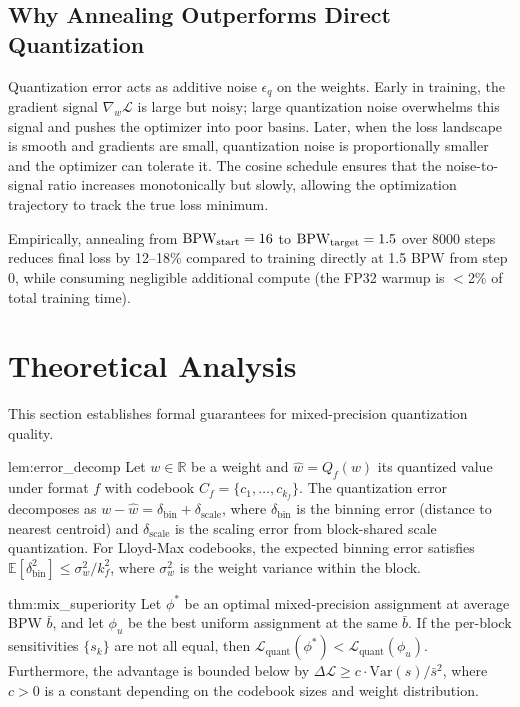 \subsection{Why Annealing Outperforms Direct Quantization}

Quantization error acts as additive noise $\epsilon_q$ on the weights.
Early in training, the gradient signal $\nabla_w \mathcal{L}$ is large
but noisy; large quantization noise overwhelms this signal and pushes
the optimizer into poor basins.  Later, when the loss landscape is
smooth and gradients are small, quantization noise is proportionally
smaller and the optimizer can tolerate it.  The cosine schedule ensures
that the noise-to-signal ratio increases monotonically but slowly,
allowing the optimization trajectory to track the true loss minimum.

Empirically, annealing from $\textnormal{BPW}_{\text{start}} = 16$ to
$\textnormal{BPW}_{\text{target}} = 1.5$ over 8000 steps reduces final loss by
12--18\% compared to training directly at 1.5 BPW from step 0, while
consuming negligible additional compute (the FP32 warmup is $<$2\% of
total training time).

\section{Theoretical Analysis}
\label{sec:mix_theory}

This section establishes formal guarantees for mixed-precision
quantization quality.

\begin{mylemma}{lem:error_decomp}
Let $w \in \mathbb{R}$ be a weight and $\hat{w} = Q_f(w)$ its
quantized value under format $f$ with codebook
$C_f = \{c_1, \ldots, c_{k_f}\}$.  The quantization error decomposes
as $w - \hat{w} = \delta_{\text{bin}} + \delta_{\text{scale}}$, where
$\delta_{\text{bin}}$ is the binning error (distance to nearest
centroid) and $\delta_{\text{scale}}$ is the scaling error from
block-shared scale quantization.  For Lloyd-Max codebooks, the expected
binning error satisfies
$\mathbb{E}[\delta_{\text{bin}}^2] \leq \sigma_w^2 / k_f^2$, where
$\sigma_w^2$ is the weight variance within the block.
\end{mylemma}

\begin{mythm}{thm:mix_superiority}
Let $\phi^*$ be an optimal mixed-precision assignment at average BPW
$\bar{b}$, and let $\phi_u$ be the best uniform assignment at the same
$\bar{b}$.  If the per-block sensitivities $\{s_k\}$ are not all
equal, then
$\mathcal{L}_{\text{quant}}(\phi^*) < \mathcal{L}_{\text{quant}}(\phi_u)$.
Furthermore, the advantage is bounded below by
$\Delta \mathcal{L} \geq c \cdot \text{Var}(s) / \bar{s}^2$, where
$c > 0$ is a constant depending on the codebook sizes and weight
distribution.
\end{mythm}

